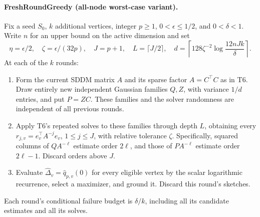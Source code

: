 \documentclass[11pt]{article}
\begin{document}
\paragraph{FreshRoundGreedy (all-node worst-case variant).}
Fix a seed $S_0$, $k$ additional vertices, integer $p\geq1$,
$0<\epsilon\leq1/2$, and $0<\delta<1$. Write $n$ for an upper
bound on the active dimension and set
\begin{equation}\label{eq:freshparams}
 \eta=\epsilon/2,\quad\zeta=\epsilon/(32p),\quad
 J=p+1,\quad L=\lceil J/2\rceil,\quad
 d=\left\lceil128\zeta^{-2}\log\frac{12nJk}{\delta}\right\rceil.
\end{equation}
At each of the $k$ rounds:
\begin{enumerate}
\item Form the current SDDM matrix $A$ and its sparse factor
$A=C^\top C$ as in T6. Draw entirely new independent Gaussian
families $Q,Z$, with variance $1/d$ entries, and put $P=ZC$.
These families and the solver randomness are independent of all
previous rounds.
\item Apply T6's repeated solves to these families through depth
$L$, obtaining every $r_{j,v}=e_v^\top A^{-j}e_v$, $1\leq j\leq J$,
with relative tolerance $\zeta$. Specifically, squared columns of
$QA^{-\ell}$ estimate order $2\ell$, and those of $PA^{-\ell}$
estimate order $2\ell-1$. Discard orders above $J$.
\item Evaluate $\widehat\Delta_v=\widehat q_{p,v}(0)$ for every
eligible vertex by the scalar logarithmic recurrence, select a
maximizer, and ground it. Discard this round's sketches.
\end{enumerate}
Each round's conditional failure budget is $\delta/k$, including
all its candidate estimates and all its solves.
\end{document}
